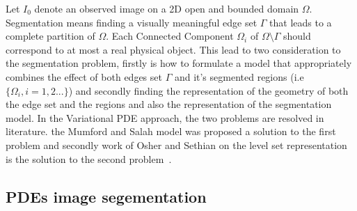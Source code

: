\documentclass{WitsPhysicsReport}
\begin{document}


Let $I_{0}$ denote an observed image on a 2D open and bounded domain $\Omega$. Segmentation means finding a  visually meaningful edge set $\Gamma$ that leads to a complete partition of $\Omega$. Each Connected Component $\Omega_{i}$ of $\Omega \setminus \Gamma $ should correspond to at most a real physical object. This lead to two consideration to the segmentation problem, firstly is how to formulate a model that appropriately combines the effect  of both edges set $\Gamma$  and it's segmented regions (i.e  $\{ \Omega_{i}, i =1,2...\}$) and secondly finding the representation of the geometry of both the edge set and the regions and also the representation of the segmentation model. In the Variational PDE approach, the two problems are resolved in literature. the Mumford and Salah model was proposed a solution to the first problem and secondly work of Osher and Sethian  on the level set representation is the solution to the second problem~\cite{mumford1989optimal,osher1988fronts}.



\subsection{PDEs image segementation}
\label{sec:partial_differential_equation_segmentation_based_methods}
\end{document}
